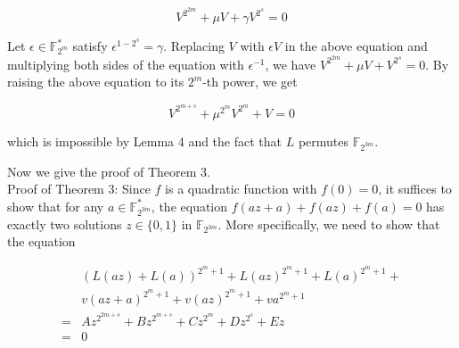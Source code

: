\documentclass[10pt]{article}
\begin{document}
$$
V^{2^{2 m}}+\mu V+\gamma V^{2^{s}}=0
$$

Let $\epsilon \in \mathbb{F}_{2^{m}}^{*}$ satisfy $\epsilon^{1-2^{s}}=\gamma$. Replacing $V$ with $\epsilon V$ in the above equation and multiplying both sides of the equation with $\epsilon^{-1}$, we have $V^{2^{2 m}}+\mu V+V^{2^{s}}=0$. By raising the above equation to its $2^{m}$-th power, we get

$$
V^{2^{m+s}}+\mu^{2^{m}} V^{2^{m}}+V=0
$$

which is impossible by Lemma 4 and the fact that $L$ permutes $\mathbb{F}_{2^{3 m}}$.

Now we give the proof of Theorem 3.\\
Proof of Theorem 3: Since $f$ is a quadratic function with $f(0)=0$, it suffices to show that for any $a \in \mathbb{F}_{2^{3 m}}^{*}$, the equation $f(a z+a)+f(a z)+f(a)=0$ has exactly two solutions $z \in\{0,1\}$ in $\mathbb{F}_{2^{3 m}}$. More specifically, we need to show that the equation


\begin{align*}
& (L(a z)+L(a))^{2^{m}+1}+L(a z)^{2^{m}+1}+L(a)^{2^{m}+1}+ \\
& v(a z+a)^{2^{m}+1}+v(a z)^{2^{m}+1}+v a^{2^{m}+1} \\
= & A z^{2^{2 m+s}}+B z^{2^{m+s}}+C z^{2^{m}}+D z^{2^{s}}+E z \\
= & 0 \tag{19}
\end{align*}
\end{document}
